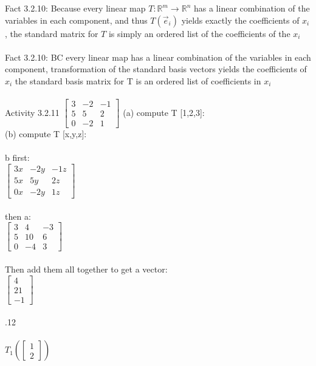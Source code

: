 \documentclass{article}
\begin{document}
Fact 3.2.10: Because every linear map $T \colon \mathbb{R}^{m} \rightarrow \mathbb{R}^{n}$ has a linear combination of the variables in each component, and thus $T(\vec{e}_{i})$
yields exactly the coefficients of $x_{i}$, the standard matrix for $T$ is simply an ordered list of the coefficients of the $x_{i}$\\
\\
Fact 3.2.10: BC every linear map has a linear combination of the variables in each component, transformation of the standard basis vectors yields the coefficients of $x_{i}$  the standard basis matrix for T is an ordered list of coefficients in $x_{i}$\\
\\
Activity 3.2.11
$\left[ \begin{matrix} 3 & -2 & -1 \\ 5 & 5 & 2 \\ 0 & -2 & 1 \end{matrix} \right]$
(a) compute T [1,2,3]:\\
(b) compute T [x,y,z]:\\
\\
b first:\\
$\left[ \begin{matrix} 3x & -2y & -1z \\ 5x & 5y & 2z \\ 0x & -2y & 1z \end{matrix} \right]$\\
\\
then a:\\
$\left[ \begin{matrix} 3 & 4 & -3 \\ 5 & 10 & 6 \\ 0 & -4 & 3 \end{matrix} \right]$\\
\\
Then add them all together to get a vector:\\
$\left[ \begin{matrix} 4\\ 21 \\ -1 \end{matrix} \right]$\\
\\
.12\\
\\
$T_{1} \left( \left[ \begin{matrix} 
1\\2 
\end{matrix} \right] \right)$ 
\end{document}
